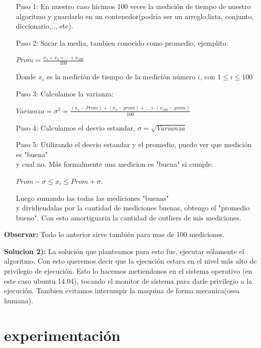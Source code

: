 \documentclass[a4paper]{article}
\begin{document}
\begin{itemize}
	\item[Paso 1:] En nuestro caso hicimos 100 veces la medición de tiempo de nuestro algoritmo y guardarlo en un contenedor(podría ser un arreglo,lista, conjunto, diccionario,.., etc).
	\item[Paso 2:] Sacar la media, tambien conocido como promedio, ejemplito:
		\begin{center} $ Prom =\frac{x_1+x_2+...+x_{100}}{100}$ \end{center}
		Donde $x_i$ es la medición de tiempo de la medición número $i$, con $1 \leq i \leq 100$ 
	\item[Paso 3:] Calculamos la varianza: 			
				\begin{center}
					$Varianza = \sigma^2 = \frac{(x_1 - Prom)+ (x_2 - prom)+ ...+ (x_{100} - prom)}{100} $
				\end{center}
	\item[Paso 4:] Calculamos el desvio estandar,  $\sigma = \sqrt{Varianza}$
	\item[Paso 5:] Utilizando el desvio estandar y el promedio, puedo ver que medición es "buena"  \\ y cual no. Más formalmente una medicion es "buena" si cumple: 
					\begin{center}
					$Prom - \sigma \leq x_i \leq Prom + \sigma $. %
					\end{center}
	 Luego sumando las todas las mediciones  "buenas" \\ y dividiendalas por la cantidad de mediciones buenas, obtengo el "promedio bueno". Con esto amortiguaria la cantidad de outliers de mis mediciones. 			
\end{itemize}

\textbf{Observar:} Todo lo anterior sirve también para mas de 100 mediciones. \newline

\textbf{Solucion 2):} La solución que planteamos para esto fue, ejecutar sólamente el algoritmo. Con esto queremos decir que la ejecución estara en el nivel más alto de privilegio de ejecución. Esto lo hacemos metiendonos en el sistema operativo (en este caso ubuntu 14.04), tocando el monitor de sistema para darle privilegio a la ejecución. Tambien evitamos interumpir la maquina de forma mecanica(osea humana).  

\section{experimentación}

\end{document}
